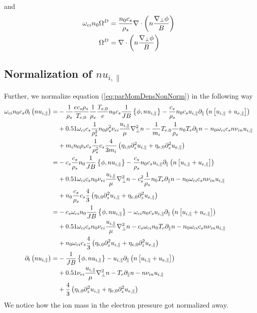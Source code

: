 %
and
%
\begin{align*}
    \omega_{ci}n_0\Omega^D &= \frac{n_0 c_s}{\rho_s}\nabla\cdot\left(n\frac{\nabla_\perp\phi}{B}\right)\\
    \Omega^D &= \nabla\cdot\left(n\frac{\nabla_\perp\phi}{B}\right)
\end{align*}
%

\subsection{Normalization of \texorpdfstring{$nu_{i,\|}$}{the parallel momentum density}}
%
Further, we normalize equation (\ref{eq:parMomDensNonNorm}) in the following way
%
\begin{align*}
    \omega_{ci}n_0c_s\partial_t\left( n u_{i,\|}\right)
 =&
 -\frac{1}{\rho_s}\frac{ec_s\rho_s}{T_{e,0}}\frac{1}{\rho_s}\frac{T_{e,0}}{e}n_0c_s\frac{1}{JB}\left\{\phi, n u_{i,\|}\right\}
 - \frac{c_s}{\rho_s}n_0c_s u_{i,\|}\partial_\|\left( n \left[u_{i,\|}+ u_{e,\|} \right]\right)
   \\&
 + 0.51 \omega_{ci}c_s\frac{1}{\rho_s^2}n_0\rho_s^2\nu_{ei} \frac{u_{i,\|}}{\mu} \nabla_\perp^2 n
 - \frac{1}{m_i}T_{e,0}\frac{1}{\rho_s}n_0T_e \partial_\| n
 - n_0\omega_{ci}c_s n \nu_{i n}u_{i,\|}
   \\&
 + m_in_0\rho_sc_s\frac{1}{\rho_s^2}c_s\frac{4}{3m_i}\left(\eta_{i,0} \partial_z^2 u_{i,\|}
 + \eta_{e,0}\partial_z^2 u_{e,\|}\right)
 \\
 =&
 - c_s\frac{c_s}{\rho_s}n_0\frac{1}{JB}\left\{\phi, n u_{i,\|}\right\}
 - \frac{c_s}{\rho_s}n_0c_s u_{i,\|}\partial_\|\left( n \left[u_{i,\|}+ u_{e,\|} \right]\right)
   \\&
 + 0.51 \omega_{ci}c_sn_0\nu_{ei} \frac{u_{i,\|}}{\mu} \nabla_\perp^2 n
 - c_s^2\frac{1}{\rho_s}n_0T_e \partial_\| n
 - n_0\omega_{ci}c_s n \nu_{i n}u_{i,\|}
   \\&
 + n_0\frac{c_s}{\rho_s}c_s\frac{4}{3}\left(\eta_{i,0} \partial_z^2 u_{i,\|}
 + \eta_{e,0}\partial_z^2 u_{e,\|}\right)
 \\
 =&
 - c_s\omega_{ci}n_0\frac{1}{JB}\left\{\phi, n u_{i,\|}\right\}
 - \omega_{ci}n_0c_s u_{i,\|}\partial_\|\left( n \left[u_{i,\|}+ u_{e,\|} \right]\right)
   \\&
 + 0.51 \omega_{ci}c_sn_0\nu_{ei} \frac{u_{i,\|}}{\mu} \nabla_\perp^2 n
 - c_s\omega_{ci}n_0T_e \partial_\| n
 - n_0\omega_{ci}c_s n \nu_{i n}u_{i,\|}
   \\&
 + n_0\omega_{ci}c_s\frac{4}{3}\left(\eta_{i,0} \partial_z^2 u_{i,\|}
 + \eta_{e,0}\partial_z^2 u_{e,\|}\right)
 \\
  \partial_t\left( n u_{i,\|}\right)
 =&
 - \frac{1}{JB}\left\{\phi, n u_{i,\|}\right\}
 - u_{i,\|}\partial_\|\left( n \left[u_{i,\|}+ u_{e,\|} \right]\right)
   \\&
 + 0.51 \nu_{ei} \frac{u_{i,\|}}{\mu} \nabla_\perp^2 n
 - T_e \partial_\| n
 - n \nu_{i n}u_{i,\|}
   \\&
 + \frac{4}{3}\left(\eta_{i,0} \partial_z^2 u_{i,\|}
 + \eta_{e,0}\partial_z^2 u_{e,\|}\right)
\end{align*}
%
We notice how the ion mass in the electron pressure got normalized away.

